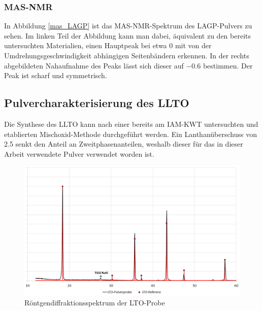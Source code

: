 \documentclass[a4paper, 11pt, headsepline,footsepline,twoside,abstract]{scrbook}
\begin{document}
\subsubsection{MAS-NMR}
In Abbildung \ref{mas_LAGP} ist das MAS-NMR-Spektrum des LAGP-Pulvers zu sehen. Im linken Teil der Abbildung kann man dabei, äquivalent zu den bereits untersuchten Materialien, einen Hauptpeak bei etwa \SI{0}{\nmrppm} mit von der Umdrehungsgeschwindigkeit abhängigen Seitenbändern erkennen. In der rechts abgebildeten Nahaufnahme des Peaks lässt sich dieser auf \SI{-0.6}{\nmrppm} bestimmen. Der Peak ist scharf und symmetrisch.
\subsection{Pulvercharakterisierung des LLTO}
Die Synthese des LLTO kann nach einer bereits am IAM-KWT untersuchten und etablierten Mischoxid-Methode durchgeführt werden. Ein Lanthanüberschuss von \SI{2.5}{\masspercent} senkt den Anteil an Zweitphasenanteilen, weshalb dieser für das in dieser Arbeit verwendete Pulver verwendet worden ist.
\newpage
\begin{figure}
	\centering
	\includegraphics[width=0.9\columnwidth]{images/XRD_LTO.png}
	\caption{Röntgendiffraktionsspektrum der LTO-Probe}
	\label{xrd_LTO}
\end{figure}
\end{document}
